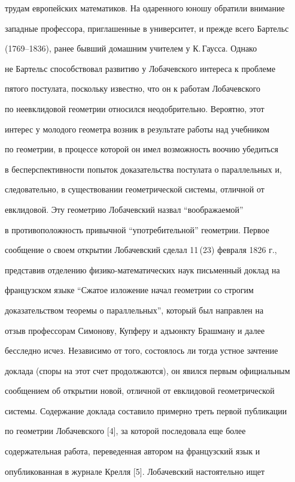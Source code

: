 трудам европейских математиков. На одаренного юношу обратили внимание 


западные профессора, приглашенные в университет, и прежде всего Бартельс


(1769--1836), ранее бывший домашним учителем у К.\,Гаусса. Однако 


не Бартельс способствовал развитию у Лобачевского интереса к проблеме 


пятого постулата, поскольку известно, что он к работам Лобачевского 


по неевклидовой геометрии относился неодобрительно. Вероятно, этот 


интерес у молодого геометра возник в результате работы над учебником 


по геометрии, в процессе которой он имел возможность воочию убедиться 


в бесперспективности попыток доказательства постулата о параллельных и, 


следовательно, в существовании геометрической системы, отличной от 


евклидовой. Эту геометрию Лобачевский назвал ``воображаемой''


в противоположность привычной ``употребительной'' геометрии. Первое 


сообщение о своем открытии Лобачевский сделал 11\,(23) февраля 1826 г., 


представив отделению физико-математических наук письменный доклад на 


французском языке ``Сжатое изложение начал геометрии со строгим 


доказательством теоремы о параллельных'', который был направлен на 


отзыв профессорам Симонову, Купферу и адъюнкту Брашману и далее 


бесследно исчез. Независимо от того, состоялось ли тогда устное зачтение 


доклада (споры на этот счет продолжаются), он явился первым официальным 


сообщением об открытии новой, отличной от евклидовой геометрической 


системы. Содержание доклада составило примерно треть первой публикации 


по геометрии Лобачевского [4], за которой последовала еще более 


содержательная работа, переведенная автором на французский язык и 


опубликованная в журнале Крелля [5]. Лобачевский настоятельно ищет 


